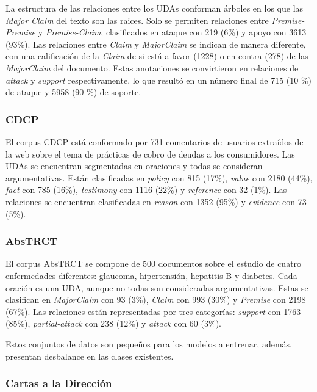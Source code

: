 \documentclass{rcci} %
\begin{document}
La estructura de las relaciones entre los UDAs conforman \'arboles en los que las \textit{Major Claim} 
del texto son las raices. Solo se permiten relaciones entre \textit{Premise-Premise} y \textit{Premise-Claim}, 
clasificados en ataque con 219 (6\%) y apoyo con 3613 (93\%). Las relaciones entre \textit{Claim} y \textit{MajorClaim} 
se indican de manera diferente, con una calificaci\'on de la \textit{Claim} de si est\'a a favor (1228) o en contra (278) de las \textit{MajorClaim} 
del documento. Estas anotaciones se convirtieron en relaciones de \textit{attack} y \textit{support} respectivamente, 
lo que result\'o en un n\'umero final de 715 (10 \%) de ataque y 5958 (90 \%) de soporte.

\subsubsection*{CDCP}\label{corpus:cdcp}

El corpus CDCP \cite{niculae2017argument} est\'a conformado por 731 comentarios de usuarios extra\'idos de la web sobre el tema de 
pr\'acticas de cobro de deudas a los consumidores.
Las UDAs se encuentran segmentadas en oraciones y todas se consideran argumentativas.
Est\'an clasificadas en 
\textit{policy} con 815 (17\%), \textit{value} con 2180 (44\%), \textit{fact} con 
785 (16\%), \textit{testimony} con 1116 (22\%) y \textit{reference} con 32 (1\%). 
Las relaciones se encuentran clasificadas en \textit{reason} con 1352 (95\%) y \textit{evidence} con 73 (5\%).

\subsubsection*{AbsTRCT}

El corpus AbsTRCT \cite{mayer2020transformer} se compone de 500 documentos sobre el estudio de cuatro enfermedades diferentes:
glaucoma, hipertensi\'on, hepatitis B y diabetes. Cada oraci\'on es una UDA, aunque no todas son consideradas
argumentativas. Estas se clasifican en \textit{MajorClaim} con 93 (3\%), \textit{Claim} con 993 (30\%) y \textit{Premise} con 2198 (67\%).
Las relaciones est\'an representadas por tres categor\'ias: \textit{support} con 1763 (85\%), \textit{partial-attack} con 238 (12\%) y
\textit{attack} con 60 (3\%).

Estos conjuntos de datos son peque\~nos para los modelos a entrenar, adem\'as, presentan desbalance en las clases 
existentes.

\subsubsection*{Cartas a la Direcci\'on}
\end{document}
